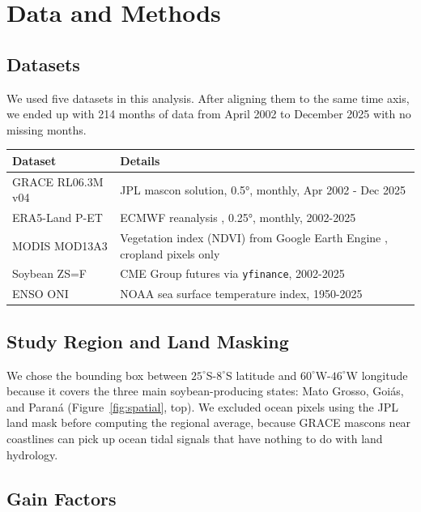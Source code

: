 \documentclass[6pt, twocolumn]{article}
\begin{document}
\columnbreak
\section{Data and Methods}
\label{sec:data}

\subsection{Datasets}

We used five datasets in this analysis. After aligning them to the
same time axis, we ended up with 214 months of data from
April 2002 to December 2025 with no missing months.

\begin{tabularx}{\columnwidth}{@{} l X @{}}
  \toprule
  \textbf{Dataset} & \textbf{Details} \\
  \midrule
  GRACE RL06.3M v04 & JPL mascon solution, 0.5°, monthly, Apr 2002 - Dec 2025 \\
  ERA5-Land P-ET  & ECMWF reanalysis \cite{hersbach2020era5}, 0.25°, monthly, 2002-2025 \\
  MODIS MOD13A3     & Vegetation index (NDVI) from Google Earth Engine \cite{gorelick2017gee, didan2021mod13a3}, cropland pixels only \\
  Soybean ZS=F      & CME Group futures via \texttt{yfinance}, 2002-2025 \\
  ENSO ONI          & NOAA sea surface temperature index, 1950-2025 \\
  \bottomrule
\end{tabularx}

\subsection{Study Region and Land Masking}

We chose the bounding box between $25^\circ$S-$8^\circ$S latitude
and $60^\circ$W-$46^\circ$W longitude because it covers the three
main soybean-producing states: Mato Grosso, Goiás, and Paraná
(Figure~\ref{fig:spatial}, top). We excluded ocean pixels using the
JPL land mask before computing the regional average, because GRACE
mascons near coastlines can pick up ocean tidal signals that have
nothing to do with land hydrology.

\subsection{Gain Factors}
\end{document}
